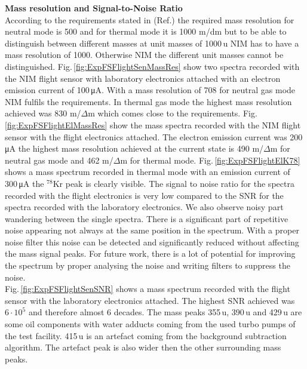
		\textbf{Mass resolution and Signal-to-Noise Ratio}\\
		According to the requirements stated in (Ref.) %
		the required mass resolution for neutral mode is 500 and for thermal mode it is 1000 m/dm but to be able to distinguish between different masses at unit masses of 1000\,u NIM has to have a mass resolution of 1000. Otherwise NIM the different unit masses cannot be distinguished. Fig.\,\ref{fig:ExpFSFlightSenMassRes} show two spectra recorded with the NIM flight sensor with laboratory electronics attached with an electron emission current of 100\,\si{\micro\ampere}. With a mass resolution of 708 for neutral gas mode NIM fulfils the requirements. In thermal gas mode the highest mass resolution achieved was 830 m/$\Delta$m which comes close to the requirements. Fig.\,\ref{fig:ExpFSFlightElMassRes} show the mass spectra recorded with the NIM flight sensor with the flight electronics attached. The electron emission current was 200\,\si{\micro\ampere} the highest mass resolution achieved at the current state is 490 m/$\Delta$m for neutral gas mode and 462 m/$\Delta$m for thermal mode. Fig.\,\ref{fig:ExpFSFlightElK78} shows a mass spectrum recorded in thermal mode with an emission current of 300\,\si{\micro\ampere} the $^{78}$Kr peak is clearly visible. The signal to noise ratio for the spectra recorded with the flight electronics is very low compared to the SNR for the spectra recorded with the laboratory electronics. We also observe noisy part wandering between the single spectra. There is a significant part of repetitive noise appearing not always at the same position in the spectrum. With a proper noise filter this noise can be detected and significantly reduced without affecting the mass signal peaks. For future work, there is a lot of potential for improving the spectrum by proper analysing the noise and writing filters to suppress the noise.\\
		Fig.\,\ref{fig:ExpFSFlightSenSNR} shows a mass spectrum recorded with the flight sensor with the laboratory electronics attached. The highest SNR achieved was $6\cdot10^{5}$ and therefore almost 6 decades. %
		The mass peaks 355\,u, 390\,u and 429\,u are some oil components with water adducts coming from the used turbo pumps of the test facility. 415\,u is an artefact coming from the background subtraction algorithm. The artefact peak is also wider then the other surrounding mass peaks.
		
